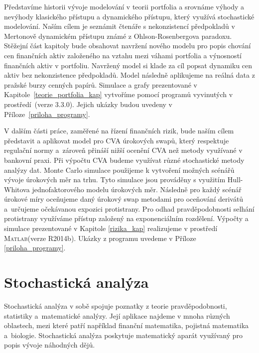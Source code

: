 \documentclass[a4paper,12pt]{report}
\makeatletter
\theoremstyle{definition} \newtheorem{definice}[veta]{Definice}
\theoremstyle{remark}
\newcommand{\MATLAB}{\textsc{Matlab}\xspace}
\def\R{\scalebox{\f@size}{\usebox\rbox}\xspace}
\makeatother
\begin{document}
Představíme historii vývoje modelování v teorii portfolia a srovnáme výhody a nevýhody klasického přístupu a dynamického přístupu, který využívá stochastické modelování.
Naším cílem je seznámit čtenáře s nekonzistencí předpokladů v Mertonově dynamickém přístupu známé z Ohlson-Rosenbergova paradoxu.
Stěžejní část kapitoly bude obsahovat navržení nového modelu pro popis chování cen finančních aktiv založeného na vztahu mezi váhami portfolia a výnosností finančních aktiv v portfoliu.
Navržený model si klade za cíl popsat dynamiku cen aktiv bez nekonzistence předpokladů.
Model následně aplikujeme na reálná data z pražské burzy cenných papírů.
Simulace a grafy prezentované v Kapitole~\ref{teorie_portfolia_kap} vytvoříme pomocí programů vyvinutých v prostředí~\R (verze 3.3.0).
Jejich ukázky budou uvedeny v Příloze~\ref{priloha_programy}.

V dalším části práce, zaměřené na  řízení finančních rizik, bude naším cílem představit a aplikovat model pro CVA úrokových swapů, který respektuje regulační normy a~zároveň přináší nižší ocenění CVA než metody využívané v bankovní praxi.
Při výpočtu CVA budeme využívat různé stochastické metody analýzy dat.
Monte Carlo simulace použijeme k vytvoření  možných scénářů vývoje úrokových měr na trhu. 
Tyto simulace jsou prováděny s využitím Hull-Whitova jednofaktorového modelu úrokových měr.
Následně pro každý scénář úrokové míry oceňujeme daný úrokový swap metodami pro oceňování derivátů a~určujeme očekávanou expozici protistrany.
Pro odhad pravděpodobnosti selhání protistrany využíváme přístup založený na exponenciálním rozdělení.
Výpočty a simulace prezentované v Kapitole \ref{rizika_kap} realizujeme v prostředí \MATLAB (verze  R2014b).
Ukázky z programu uvedeme v Příloze \ref{priloha_programy}.


\chapter{Stochastická analýza}\label{stochasticka_analyza_kap}
Stochastická analýza v sobě spojuje poznatky z teorie pravděpodobnosti, statistiky a~matematické analýzy.
Její aplikace najdeme v mnoha různých oblastech, mezi které patří například finanční matematika, pojistná matematika a~biologie.
Stochastická analýza poskytuje matematický aparát využívaný pro popis vývoje náhodných dějů.
\end{document}
